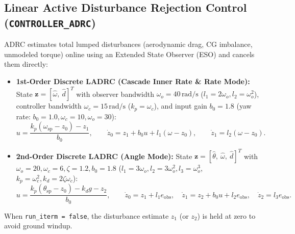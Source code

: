 \documentclass[11pt,a4paper]{article}
\begin{document}
\subsection{Linear Active Disturbance Rejection Control (\texttt{CONTROLLER\_ADRC})}
ADRC estimates total lumped disturbances (aerodynamic drag, CG imbalance, unmodeled torque) online using an Extended State Observer (ESO) and cancels them directly:
\begin{itemize}
  \item \textbf{1st-Order Discrete LADRC (Cascade Inner Rate \& Rate Mode):} State $\mathbf{z} = [\hat{\omega},\ \hat{d}]^T$ with observer bandwidth $\omega_o = 40\,\text{rad/s}$ ($l_1 = 2\omega_o, l_2 = \omega_o^2$), controller bandwidth $\omega_c = 15\,\text{rad/s}$ ($k_p = \omega_c$), and input gain $b_0 = 1.8$ (yaw rate: $b_0=1.0, \omega_c=10, \omega_o=30$):
  \begin{equation}
    u = \frac{k_p(\omega_{\text{sp}} - z_0) - z_1}{b_0}, \qquad
    \dot{z}_0 = z_1 + b_0 u + l_1(\omega - z_0), \qquad
    \dot{z}_1 = l_2(\omega - z_0).
  \end{equation}
  \item \textbf{2nd-Order Discrete LADRC (Angle Mode):} State $\mathbf{z} = [\hat{\theta},\ \hat{\omega},\ \hat{d}]^T$ with $\omega_o = 20, \omega_c = 6, \zeta = 1.2, b_0 = 1.8$ ($l_1 = 3\omega_o, l_2 = 3\omega_o^2, l_3 = \omega_o^3$, $k_p = \omega_c^2, k_d = 2\zeta\omega_c$):
  \begin{equation}
    u = \frac{k_p(\theta_{\text{sp}} - z_0) - k_d g - z_2}{b_0}, \qquad
    \dot{z}_0 = z_1 + l_1 e_{\text{obs}}, \quad
    \dot{z}_1 = z_2 + b_0 u + l_2 e_{\text{obs}}, \quad
    \dot{z}_2 = l_3 e_{\text{obs}}.
  \end{equation}
\end{itemize}
When \texttt{run\_iterm = false}, the disturbance estimate $z_1$ (or $z_2$) is held at zero to avoid ground windup.
\end{document}
